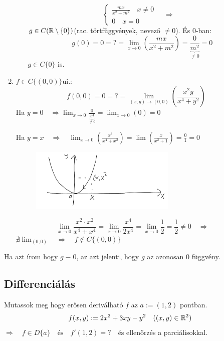 \documentclass[a4paper,11.5pt]{article}
\begin{document}
\begin{task}
\begin{enumerate}
\begin{enumerate}
\[\begin{cases}
					\frac{mx}{x^2+m^2}\quad x\not=0\\
					0\quad x=0
				\end{cases}\quad \Rightarrow\quad   \]
				$g\in C(\mathbb{R}\setminus\{0\})$\quad (rac. törtfüggvények, nevező $\not=0$). És 0-ban:
				\[ g(0)=0=?=\lim_{x\to0}\left(\frac{mx}{x^2+m^2}\right)=\frac{0}{\underbrace{m^2}_{\not=0}}=0 \]
				$g\in C\{0\}$ is.
			\end{enumerate}
			\item $f\in C\{ (0,0) \}$\quad ui.:
			\[ f(0,0)=0=?=\lim_{(x,y)\to(0,0)}\left(\frac{x^2y}{x^4+y^2}\right) \]
			Ha $y=0\quad \Rightarrow\lim_{x\to0}\frac{0}{\underbrace{x^4}_{\not=0}}=\lim_{x\to0}(0)=0$
			
			Ha $y=x\quad \Rightarrow\quad \lim_{x\to0}\left(\frac{x^3}{x^4+x^2}\right)=\lim\left(\frac{x}{x^2+1}\right)=\frac{0}{1}=0$
			
			\begin{figure}[H]
				\centering
				\includegraphics[height=3cm]{kepek/03.png}
				\caption{}
			\end{figure}
			\[ \lim_{x\to0}\frac{x^2\cdot x^2}{x^4+x^4}=\lim_{x\to0}\frac{x^4}{2x^4}=\lim_{x\to0}\frac{1}{2}=\frac{1}{2}\not=0\quad \Rightarrow\quad  \]
			$\nexists\lim_{(0,0)}\quad \Rightarrow \quad f\notin C\{(0,0)\}$
		\end{enumerate}
		\begin{note}
			Ha azt írom hogy $g\equiv0$, az azt jelenti, hogy $g$ az azonosan 0 függvény.
		\end{note}
		\subsection{Differenciálás}
		\begin{task} Mutassok meg hogy erősen deriválható $f$ az $a:=(1,2)$ pontban.
			\[ f(x,y):=2x^2+3xy-y^2 \quad ((x,y)\in\mathbb{R}^2) \]
			$\Rightarrow\quad f\in D\{a\}\quad \text{és}\quad f'(1,2)=?\quad \text{és}$ ellenőrzés a parciálisokkal.
			

\end{task}
\end{task}
\end{document}
